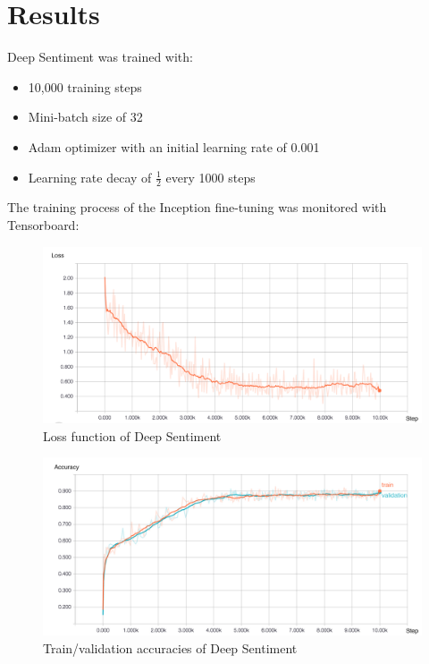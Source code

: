 \section{Results}
Deep Sentiment was trained with:
\begin{itemize}[topsep=0pt]
    \itemsep-1em
    \item 10,000 training steps
    \item Mini-batch size of 32
    \item Adam optimizer with an initial learning rate of 0.001
    \item Learning rate decay of $\frac{1}{2}$ every 1000 steps
\end{itemize}

The training process of the Inception fine-tuning was monitored with Tensorboard:
\begin{figure}[H]
    \centering
    \includegraphics[width=\textwidth]{Images/image_text_model_loss_cleaned.jpg}
    \caption{Loss function of Deep Sentiment}
\end{figure}

\begin{figure}[H]
    \centering
    \includegraphics[width=\textwidth]{Images/image_text_model_accuracies_cleaned.jpg}
    \caption{Train/validation accuracies of Deep Sentiment}
\end{figure}

